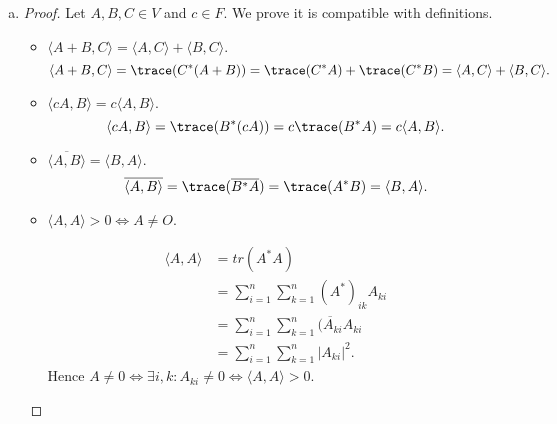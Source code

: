\begin{Exercise}
\begin{enumerate}[(a)]
\item
\begin{proof}
Let $A,B,C\in V$ and $c\in F$. We prove it is compatible with definitions.
\begin{itemize}
\item $\langle A+B,C \rangle = \langle A,C \rangle + \langle B,C \rangle$.
$$
\langle A+B,C \rangle
= \trace(C^*(A+B))
= \trace(C^* A) + \trace(C^* B)
= \langle A,C \rangle + \langle B,C \rangle.
$$

\item $\langle c A, B \rangle = c\langle A,B \rangle$.
$$
\langle c A,B \rangle
= \trace(B^*(c A) )
= c \trace( B^* A)
= c\langle A,B \rangle.
$$

\item $\overline{\langle A,B \rangle} = \langle B,A \rangle$.
$$
\overline{\langle A,B \rangle}
= \trace(\overline{B^* A} )
= \trace(A^* B)
= \langle B, A \rangle.
$$

\item $\langle A,A \rangle > 0\iff A\neq O$.

\begin{align*}
\langle A,A \rangle
&= tr(A^* A) \\
&= \sum_{i=1}^{n} \sum_{k=1}^{n} (A^*)_{i k} A_{k i} \\
&=  \sum_{i=1}^{n} \sum_{k=1}^{n} \overline{(A_{k i}} A_{k i} \\
&= \sum_{i=1}^{n} \sum_{k=1}^{n} |A_{k i}|^2.
\end{align*}
Hence $A\neq 0 \iff \exists i,k:A_{k i} \neq 0 \iff \langle A,A \rangle > 0$.
\end{itemize}
\end{proof}
\end{enumerate}
\end{Exercise}